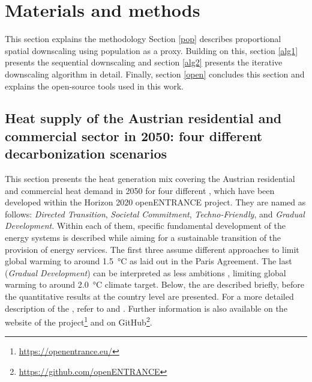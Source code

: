 \section{Materials and methods}\label{methodology}
This section explains the methodology   Section \ref{pop} describes proportional spatial downscaling using population as a proxy. Building on this, section \ref{alg1} presents the sequential downscaling and section \ref{alg2} presents the iterative downscaling algorithm in detail.  Finally, section \ref{open} concludes this section and explains the open-source tools used in this work.

\subsection{Heat supply of the Austrian residential and commercial sector in 2050: four different decarbonization scenarios}\label{res:1}
This section presents the heat generation mix covering the Austrian residential and commercial heat demand in 2050 for four different , which have been developed within the Horizon 2020 openENTRANCE project. They are named as follows: \textit{Directed Transition}, \textit{Societal Commitment}, \textit{Techno-Friendly}, and \textit{Gradual Development}. Within each of them, specific fundamental development of the energy systems is described while aiming for a sustainable transition of the provision of energy services. The first three  assume different approaches to limit global warming to around \SI{1.5}{\degreeCelsius} as laid out in the Paris Agreement.  The last  (\textit{Gradual Development}) can be interpreted as less ambitions , limiting global warming to around \SI{2.0}{\degreeCelsius} climate target.  Below, the  are described briefly, before the quantitative results at the country level are presented. For a more detailed description of the , refer to \cite{auer2020quantitative} and \cite{auer2020development}. Further information is also available on the website of the project\footnote{\url{https://openentrance.eu/}} and on GitHub\footnote{\url{https://github.com/openENTRANCE}}.\vspace{0.3cm}

